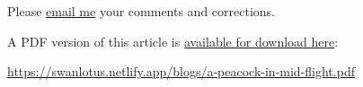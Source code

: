 \documentclass[
  a4paper,
]{article}
\begin{document}
Please \href{mailto:feedback.swanlotus@gmail.com}{email me} your
comments and corrections.

\noindent A PDF version of this article is
\href{./a-peacock-in-midflight.pdf}{available for download here}:

\begin{normalsize}

\begin{ttfamily}

\url{https://swanlotus.netlify.app/blogs/a-peacock-in-mid-flight.pdf}

\end{ttfamily}

\end{normalsize}
\end{document}
